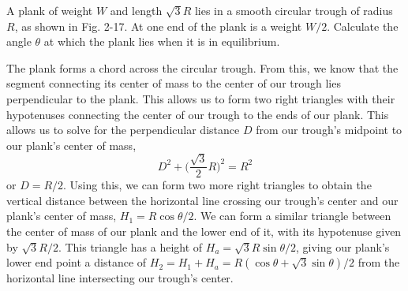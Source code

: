 \documentclass[../feynman-lectures-on-physics.tex]{subfiles}
\begin{document}
\begin{questions}


\question A plank of weight $W$ and length $\sqrt{3}R$ lies in a smooth circular trough of radius $R$, as shown in Fig. 2-17. At one end of the plank is a weight $W/2$. Calculate the angle $\theta$ at which the plank lies when it is in equilibrium.

\begin{solution}
	The plank forms a chord across the circular trough. From this, we know that the segment connecting its center of mass to the center of our trough lies perpendicular to the plank. This allows us to form two right triangles with their hypotenuses connecting the center of our trough to the ends of our plank. This allows us to solve for the perpendicular distance $D$ from our trough's midpoint to our plank's center of mass,
	\[
	D^2 + \Big(\frac{\sqrt{3}}{2}R\Big)^2 = R^2
	\] 
	or $D = R/2$. Using this, we can form two more right triangles to obtain the vertical distance between the horizontal line crossing our trough's center and our plank's center of mass, $H_1 = R\cos\theta/2$. We can form a similar triangle between the center of mass of our plank and the lower end of it, with its hypotenuse given by $\sqrt{3}R/2$. This triangle has a height of $H_a = \sqrt{3}R\sin\theta/2$, giving our plank's lower end point a distance of $H_2 = H_1 + H_a = R(\cos\theta + \sqrt{3}\sin\theta)/2$ from the horizontal line intersecting our trough's center.


\end{solution}
\end{questions}
\end{document}
